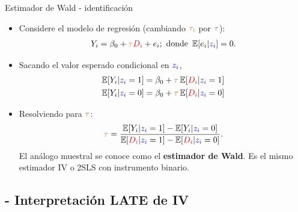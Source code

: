 \documentclass[10pt, xcolor=dvipsnames]{beamer}
\begin{document}
\begin{frame}{Estimador de Wald - identificación}
\begin{itemize} 
    \item Considere el modelo de regresión (cambiando \(\textcolor{brown}{\tau_i}\) por \(\textcolor{brown}{\tau}\)):
		\begin{align*}
		Y_i = \beta_0 + \textcolor{brown}{\tau} \textcolor{red}{D_i} + e_i; \,\, \text{donde} \,\,  \operatorname{\mathbb{E}}[e_i \vert \textcolor{blue}{z_i}]=0.
		\end{align*}
		\item Sacando el valor esperado condicional en $\textcolor{blue}{z_i}$,
		\begin{align*}
        \begin{split}
		\operatorname{\mathbb{E}}[Y_i|\textcolor{blue}{z_i}=1] &= \beta_0 + \textcolor{brown}{\tau} \operatorname{\mathbb{E}}[\textcolor{red}{D_i}|\textcolor{blue}{z_i}=1] \\
		\operatorname{\mathbb{E}}[Y_i|\textcolor{blue}{z_i}=0] &= \beta_0 + \textcolor{brown}{\tau} \operatorname{\mathbb{E}}[\textcolor{red}{D_i}|\textcolor{blue}{z_i}=0]
	\end{split}	
        \end{align*}
        \item Resolviendo para \(\textcolor{brown}{\tau}\):
		\begin{align*}
		\begin{split}
		\textcolor{brown}{\tau} = \frac{\operatorname{\mathbb{E}}[Y_i|\textcolor{blue}{z_i}=1] - \operatorname{\mathbb{E}}[Y_i|\textcolor{blue}{z_i}=0]}{\operatorname{\mathbb{E}}[\textcolor{red}{D_i}|\textcolor{blue}{z_i}=1] - \operatorname{\mathbb{E}}[\textcolor{red}{D_i}|\textcolor{blue}{z_i}=0]}.	
		\end{split}		
		\end{align*}
		El análogo muestral se conoce como el \textbf{estimador de Wald}. Es el mismo estimador IV o 2SLS con instrumento binario.
	\end{itemize}	
\end{frame}


\subsection{- Interpretación LATE de IV}
\end{document}
